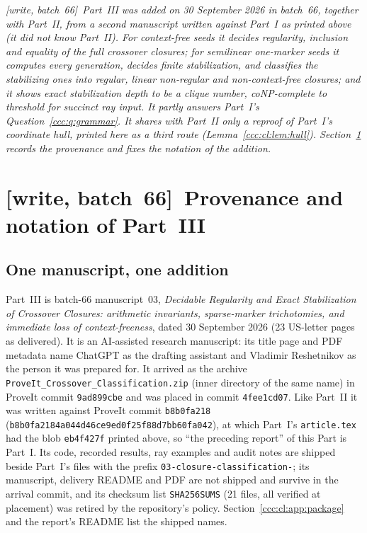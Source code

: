 \documentclass[11pt,letterpaper]{article}
\theoremstyle{definition}
\theoremstyle{remark}
\newcommand{\wsix}{\textup{[write, batch~66]}}
\begin{document}
\noindent\emph{\wsix\ Part~III was added on 30 September 2026 in batch~66,
together with Part~II, from a second manuscript written against Part~I as
printed above (it did not know Part~II). For context-free seeds it decides
regularity, inclusion and equality of the full crossover closures; for
semilinear one-marker seeds it computes every generation, decides finite
stabilization, and classifies the stabilizing ones into regular, linear
non-regular and non-context-free closures; and it shows exact stabilization
depth to be a clique number, coNP-complete to threshold for succinct ray
input. It partly answers Part~I's Question~\ref{ccc:q:grammar}. It shares
with Part~II only a reproof of Part~I's coordinate hull, printed here as a
third route (Lemma~\ref{ccc:cl:lem:hull}). Section~\ref{ccc:cl:sec:provenance}
records the provenance and fixes the notation of the addition.}

\section{\texorpdfstring{\wsix\ }{}Provenance and notation of Part~III}
\label{ccc:cl:sec:provenance}

\subsection{One manuscript, one addition}\label{ccc:cl:sec:source}

Part~III is batch-66 manuscript~03, \emph{Decidable Regularity and Exact
Stabilization of Crossover Closures: arithmetic invariants, sparse-marker
trichotomies, and immediate loss of context-freeness}, dated 30 September
2026 (23 US-letter pages as delivered). It is an AI-assisted research
manuscript: its title page and PDF metadata name ChatGPT as the drafting
assistant and Vladimir Reshetnikov as the person it was prepared for. It
arrived as the archive \texttt{ProveIt\_Crossover\_Classification.zip} (inner
directory of the same name) in ProveIt commit \texttt{9ad899cbe} and was
placed in commit \texttt{4fee1cd07}. Like Part~II it was written against
ProveIt commit \texttt{b8b0fa218}
(\nolinkurl{b8b0fa2184a044d46ce9ed0f25f88d7bb60fa042}), at which Part~I's
\texttt{article.tex} had the blob \texttt{eb4f427f} printed above, so ``the
preceding report'' of this Part is Part~I. Its code, recorded results, ray
examples and audit notes are shipped beside Part~I's files with the prefix
\nolinkurl{03-closure-classification-}; its manuscript, delivery README and
PDF are not shipped and survive in the arrival commit, and its checksum list
\texttt{SHA256SUMS} (21 files, all verified at placement) was retired by the
repository's policy. Section~\ref{ccc:cl:app:package} and the report's README
list the shipped names.
\end{document}
